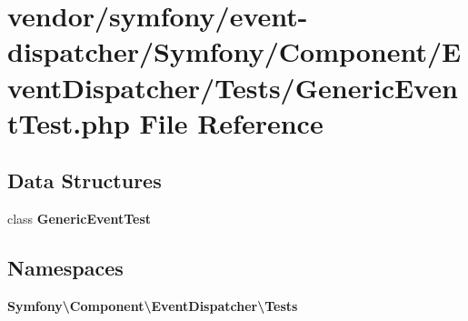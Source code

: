 \section{vendor/symfony/event-\/dispatcher/\+Symfony/\+Component/\+Event\+Dispatcher/\+Tests/\+Generic\+Event\+Test.php File Reference}
\label{_generic_event_test_8php}
\subsection*{Data Structures}
\begin{DoxyCompactItemize}
\item 
class {\bf Generic\+Event\+Test}
\end{DoxyCompactItemize}
\subsection*{Namespaces}
\begin{DoxyCompactItemize}
\item 
 {\bf Symfony\textbackslash{}\+Component\textbackslash{}\+Event\+Dispatcher\textbackslash{}\+Tests}
\end{DoxyCompactItemize}
